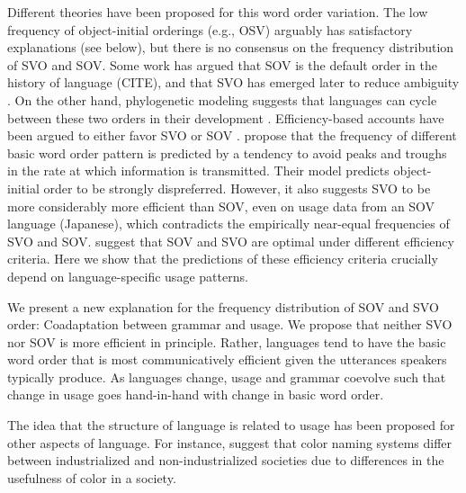 \documentclass[11pt,a4paper]{article}
\newcommand\comment[1]{{\color{red}#1}}
\begin{document}
Different theories have been proposed for this word order variation.
The low frequency of object-initial orderings (e.g., OSV) arguably has satisfactory explanations (see below), but there is no consensus on the frequency distribution of SVO and SOV.
Some work has argued that SOV is the default order in the history of language (CITE), and that SVO has emerged later to reduce ambiguity \citep{gibson-noisy-channel-2013}.
On the other hand, phylogenetic modeling suggests that languages can cycle between these two orders in their development \citep{maurits2014tracing}.
Efficiency-based accounts have been argued to either favor SVO or SOV \citep{maurits-why-2010, ferrer-i-cancho-placement-2017}.
\cite{maurits2010why} propose that the frequency of different basic word order pattern is predicted by a tendency to avoid peaks and troughs in the rate at which information is transmitted.
Their model predicts object-initial order to be strongly dispreferred.
However, it also suggests SVO to be more considerably more efficient than SOV, even on usage data from an SOV language (Japanese), which contradicts the empirically near-equal frequencies of SVO and SOV.
\citep{ferrer-i-cancho-placement-2017} suggest that SOV and SVO are optimal under different efficiency criteria.
Here we show that the predictions of these efficiency criteria crucially depend on language-specific usage patterns.

We present a new explanation for the frequency distribution of SOV and SVO order:
{Coadaptation} between grammar and usage.
We propose that neither SVO nor SOV is more efficient in principle.
Rather, languages tend to have the basic word order that is most communicatively efficient given the utterances speakers typically produce.
As languages change, usage and grammar coevolve such that change in usage goes hand-in-hand with change in basic word order.

The idea that the structure of language is related to usage has been proposed for other aspects of language.
For instance, \cite{gibson2017color} suggest that color naming systems differ between industrialized and non-industrialized societies due to differences in the usefulness of color in a society.
\end{document}
